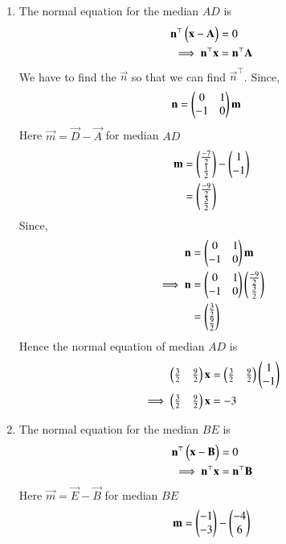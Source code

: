 \documentclass[journal,12pt,onecolumn]{IEEEtran}
\theoremstyle{remark}
\begin{document}
\begin{enumerate}
 \item The normal equation for the median $AD$ is
  \begin{align}
    \mathbf{n}^{\top}\begin{pmatrix}\mathbf{x}-\mathbf{A}\end{pmatrix}&=0\\
    \implies
    \mathbf{n}^{\top}\mathbf{x}&=\mathbf{n}^{\top}\mathbf{A}
  \end{align}
 We have to find the $\vec{n}$ so that we can find $\vec{n}^{\top}$.
 Since,
\begin{align}
  \mathbf{n} &= \begin{pmatrix}0 & 1\\
  -1 & 0\end{pmatrix}\mathbf{m}
\end{align}
Here $\vec{m} = \vec{D}- \vec{A}$ for median $AD$
\begin{align}
\mathbf{m}&=\begin{pmatrix}\frac{-7}{2}\\\frac{1}{2}\end{pmatrix} - \begin{pmatrix}1\\-1\end{pmatrix}\\
       &=\begin{pmatrix}\frac{-9}{2}\\\frac{3}{2}\end{pmatrix}
\end{align}
Since,
\begin{align}
  \mathbf{n} &= \begin{pmatrix}0 & 1\\
  -1 & 0\end{pmatrix}\mathbf{m}\\
\implies
\mathbf{n} &= \begin{pmatrix}0 & 1\\
  -1 & 0\end{pmatrix}\begin{pmatrix}\frac{-9}{2}\\\frac{3}{2}\end{pmatrix}\\
        &= \begin{pmatrix}\frac{3}{2}\\\frac{9}{2}\end{pmatrix}
\end{align}
Hence the normal equation of median $AD$ is 
\begin{align}
    \begin{pmatrix}\frac{3}{2} & \frac{9}{2}\end{pmatrix}\mathbf{x}&=\begin{pmatrix}\frac{3}{2} & \frac{9}{2}\end{pmatrix}\begin{pmatrix}1\\-1\end{pmatrix}\\
    \implies
    \begin{pmatrix}\frac{3}{2} & \frac{9}{2}\end{pmatrix}\mathbf{x}&=-3
\end{align}
\item The normal equation for the median $BE$ is
\begin{align}
\mathbf{n}^{\top}\begin{pmatrix}\mathbf{x}-\mathbf{B}\end{pmatrix}&=0\\
\implies
\mathbf{n}^{\top}\mathbf{x}&=\mathbf{n}^{\top}\mathbf{B}
\end{align}
Here $\vec{m} = \vec{E}- \vec{B}$ for median $BE$
\begin{align}
\vec{m}&=\myvec{-1\\-3} - \myvec{-4\\6}\\

\end{align}
\end{enumerate}
\end{document}
